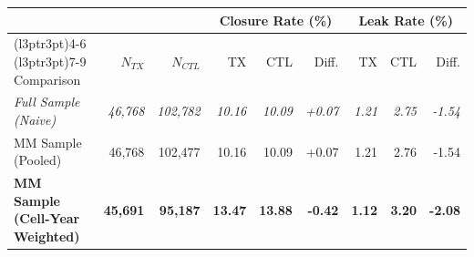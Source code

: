 \begin{table}
    \centering\begingroup\fontsize{10}{12}\selectfont
    
    \begin{tabular}[t]{lrrrrrrrr}
    \toprule
    \multicolumn{3}{c}{ } & \multicolumn{3}{c}{Closure Rate (\%)} & \multicolumn{3}{c}{Leak Rate (\%)} \\
    \cmidrule(l{3pt}r{3pt}){4-6} \cmidrule(l{3pt}r{3pt}){7-9}
    Comparison & $N_{TX}$ & $N_{CTL}$ & TX & CTL & Diff. & TX  & CTL  & Diff. \\
    \midrule
    \emph{Full Sample (Naive)} & \emph{46,768} & \emph{102,782} & \emph{10.16} & \emph{10.09} & \emph{+0.07} & \emph{1.21} & \emph{2.75} & \emph{-1.54}\\
    MM Sample (Pooled) & 46,768 & 102,477 & 10.16 & 10.09 & +0.07 & 1.21 & 2.76 & -1.54\\
    \textbf{MM Sample (Cell-Year Weighted)} & \textbf{45,691} & \textbf{95,187} & \textbf{13.47} & \textbf{13.88} & \textbf{-0.42} & \textbf{1.12} & \textbf{3.20} & \textbf{-2.08}\\
    \bottomrule
    \end{tabular}
    \endgroup{}
    \end{table}